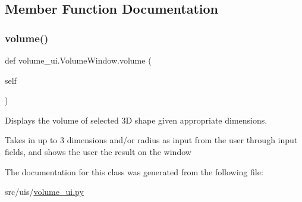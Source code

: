 \subsection{Member Function Documentation}
\mbox{\label{classvolume__ui_1_1_volume_window_a1b4cb7b0bd52c5898a39dbfb81e5cb85}} 
\subsubsection{\texorpdfstring{volume()}{volume()}}
{\footnotesize\ttfamily def volume\+\_\+ui.\+Volume\+Window.\+volume (\begin{DoxyParamCaption}\item[{}]{self }\end{DoxyParamCaption})}



Displays the volume of selected 3D shape given appropriate dimensions. 

Takes in up to 3 dimensions and/or radius as input from the user through input fields, and shows the user the result on the window 

The documentation for this class was generated from the following file\+:\begin{DoxyCompactItemize}
\item 
src/uis/\hyperlink{volume__ui_8py}{volume\+\_\+ui.\+py}\end{DoxyCompactItemize}
